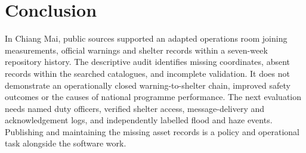 \documentclass[10pt,twocolumn,a4paper]{article}
\begin{document}
\section{Conclusion}
In Chiang Mai, public sources supported an adapted operations room joining measurements, official warnings and shelter records within a seven-week repository history. The descriptive audit identifies missing coordinates, absent records within the searched catalogues, and incomplete validation. It does not demonstrate an operationally closed warning-to-shelter chain, improved safety outcomes or the causes of national programme performance. The next evaluation needs named duty officers, verified shelter access, message-delivery and acknowledgement logs, and independently labelled flood and haze events. Publishing and maintaining the missing asset records is a policy and operational task alongside the software work.
\end{document}
